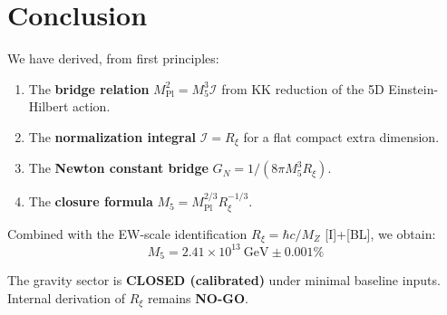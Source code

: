 \documentclass[11pt,a4paper]{article}
\newcommand{\Rxi}{R_\xi}
\newcommand{\Mpl}{M_{\mathrm{Pl}}}
\newcommand{\Mfive}{M_5}
\newcommand{\MZ}{M_Z}
\newcommand{\calI}{\mathcal{I}}
\newcommand{\GN}{G_N}
\begin{document}
\section{Conclusion}

We have derived, from first principles:

\begin{enumerate}
\item The \textbf{bridge relation} $\Mpl^2 = \Mfive^3 \calI$ from KK reduction
of the 5D Einstein-Hilbert action.
\item The \textbf{normalization integral} $\calI = \Rxi$ for a flat compact
extra dimension.
\item The \textbf{Newton constant bridge} $\GN = 1/(8\pi\Mfive^3\Rxi)$.
\item The \textbf{closure formula} $\Mfive = \Mpl^{2/3}\Rxi^{-1/3}$.
\end{enumerate}

Combined with the EW-scale identification $\Rxi = \hbar c/\MZ$ [I]+[BL], we
obtain:
\begin{equation}
\Mfive = 2.41 \times 10^{13}~\mathrm{GeV} \pm 0.001\%
\end{equation}

The gravity sector is \textbf{CLOSED (calibrated)} under minimal baseline inputs.
Internal derivation of $\Rxi$ remains \textbf{NO-GO}.
\end{document}
